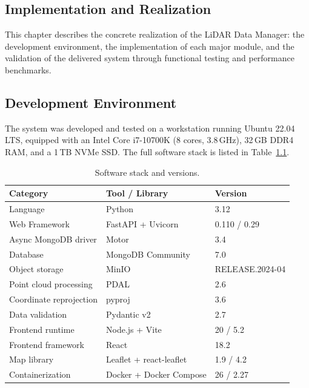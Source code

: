 \begin{center}
  \chapter{Implementation and Realization}
\end{center}
\label{chap:implementation}

\noindent
This chapter describes the concrete realization of the LiDAR Data Manager: the development environment, the implementation of each major module, and the validation of the delivered system through functional testing and performance benchmarks.

\section{Development Environment}

The system was developed and tested on a workstation running Ubuntu 22.04 LTS, equipped with an Intel Core i7-10700K (8 cores, 3.8\,GHz), 32\,GB DDR4 RAM, and a 1\,TB NVMe SSD. The full software stack is listed in Table~\ref{tab:software}.

\begin{table}[H]
  \centering
  \caption{Software stack and versions.}
  \label{tab:software}
  \begin{tabular}{lll}
    \toprule
    \textbf{Category} & \textbf{Tool / Library} & \textbf{Version} \\
    \midrule
    Language              & Python               & 3.12 \\
    Web Framework         & FastAPI + Uvicorn    & 0.110 / 0.29 \\
    Async MongoDB driver  & Motor                & 3.4 \\
    Database              & MongoDB Community    & 7.0 \\
    Object storage        & MinIO                & RELEASE.2024-04 \\
    Point cloud processing& PDAL                 & 2.6 \\
    Coordinate reprojection & pyproj             & 3.6 \\
    Data validation       & Pydantic v2          & 2.7 \\
    Frontend runtime      & Node.js + Vite       & 20 / 5.2 \\
    Frontend framework    & React                & 18.2 \\
    Map library           & Leaflet + react-leaflet & 1.9 / 4.2 \\
    Containerization      & Docker + Docker Compose & 26 / 2.27 \\
    \bottomrule
  \end{tabular}
\end{table}

